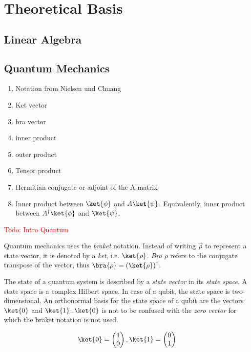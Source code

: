 \chapter{Theoretical Basis}
\section{Linear Algebra}
\section{Quantum Mechanics}
\begin{enumerate}
\item Notation from Nielsen und Chuang
\item Ket vector
\item bra vector
\item inner product
\item outer product
\item Tensor product
\item Hermitian conjugate or adjoint of the A matrix
\item Inner product between $\ket{\phi}$ and $A\ket{\psi}$. Equivalently, inner product between $A^\dagger\ket{\phi}$ and $\ket{\psi}$.
\end{enumerate}
\textcolor{red}{Todo: Intro Quantum}


Quantum mechanics uses the \textit{braket} notation. Instead of writing $\vec{\rho}$ to represent a state vector, it is denoted by a \textit{ket}, i.e. $\ket{\rho}$. \textit{Bra $\rho$} refers to the conjugate transpose of the vector, thus $\bra{\rho}=(\ket{\rho})^\dagger$. 

The state of a quantum system is described by a \textit{state vector} in its \textit{state space}. A state space is a complex Hilbert space. In case of a qubit, the state space is two-dimensional. An orthonormal basis for the state space of a qubit are the vectors $\ket{0}$ and $\ket{1}$. $\ket{0}$ is not to be confused with the \textit{zero vector} for which the braket notation is not used. 

\begin{equation}
    \ket{0}=\begin{pmatrix}1\\0\end{pmatrix}, \ket{1}=\begin{pmatrix}0\\1\end{pmatrix}
\end{equation}

